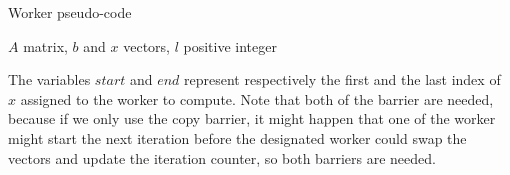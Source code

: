 \documentclass{article}
\begin{document}
	
	\begin{algorithm}[H]
		\caption{Worker pseudo-code}\label{alg:par}
		\begin{algorithmic}[1]
			\Require $A$ matrix, $b$ and $x$ vectors, $l$ positive integer
			\EndIf
			\EndFor
			\EndFor
			\EndIf
			\EndWhile
		\end{algorithmic}
	\end{algorithm}
	The variables $start$ and $end$ represent respectively the first and the last index of $x$ assigned to the worker to compute. Note that both of the barrier are needed, because if we only use the copy barrier, it might happen that one of the worker might start the next iteration before the designated worker could swap the vectors and update the iteration counter, so both barriers are needed. 
	
	
\end{document}
